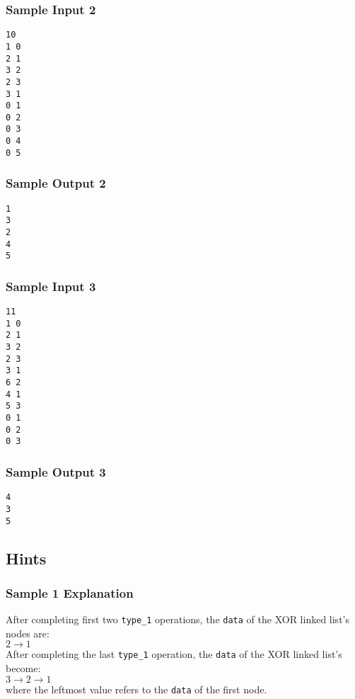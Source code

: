 \begin{multicols}{2}
\subsubsection{Sample Input 2}\label{sample-input-2}
\begin{verbatim}
10
1 0
2 1
3 2
2 3
3 1
0 1
0 2
0 3
0 4
0 5
\end{verbatim}

\columnbreak

\subsubsection{Sample Output 2}\label{sample-output-2}
\begin{verbatim}
1 
3 
2 
4 
5
\end{verbatim}
\end{multicols}

\newpage

\begin{multicols}{2}
\subsubsection{Sample Input 3}\label{sample-input-3}
\begin{verbatim}
11
1 0
2 1
3 2
2 3
3 1
6 2
4 1
5 3
0 1
0 2
0 3
\end{verbatim}
    
\columnbreak
    
\subsubsection{Sample Output 3}\label{sample-output-3}
\begin{verbatim}
4
3
5
\end{verbatim}
\end{multicols}

\subsection{Hints}\label{hints}

\subsubsection{Sample 1 Explanation}\label{sample-1-explanation}

After completing first two \texttt{type\_1} operations, the \texttt{data} of the XOR linked list's nodes are: \\
$2\rightarrow 1$ \\
After completing the last \texttt{type\_1} operation, the \texttt{data} of the XOR linked list's become: \\
$3\rightarrow 2\rightarrow 1$ \\
where the leftmost value refers to the \texttt{data} of the first node.

